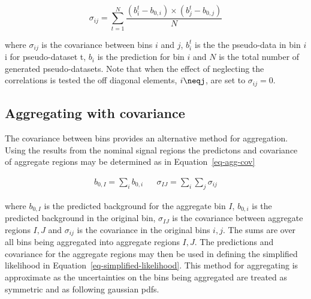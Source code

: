 \begin{equation}
\sigma_{ij}=\sum^N_{t=1}{\frac{(b^t_i-b_{0,i})\times(b^t_j-b_{0,j})}{N}}
\label{eq-cov}
\end{equation}

where $\sigma_{ij}$ is the covariance between bins $i$ and $j$, $b^t_i$ is the
the pseudo-data in bin $i$i for pseudo-dataset t, 
$b_i$ is the prediction for bin $i$ and $N$ is the total number of generated pseudo-datasets.
Note that when the effect of neglecting the correlations is tested the off diagonal 
elements, $i\neqj$, are set to $\sigma_{ij} = 0$.


\subsection{Aggregating with covariance}

The covariance between bins provides an alternative method for aggregation. 
Using the results from the nominal signal regions the predictons and covariance of aggregate regions
may be determined as in Equation~\ref{eq-agg-cov}

\begin{align}
b_{0,I} = \sum_i b_{0,i} && \sigma_{IJ}=\sum_i\sum_j\sigma_{ij}
\label{eq-agg-cov}
\end{align}

where $b_{0,I}$ is the predicted background for the aggregate bin $I$,
$b_{0,i}$ is the predicted background in the original bin, $\sigma_{IJ}$
is the covariance between aggregate regions $I,J$ and $\sigma_{ij}$ is
the covariance in the original bins $i,j$. The sums are over all
bins being aggregated into aggregate regions $I,J$. The predictions
and covariance for the aggregate regions may then be used in defining 
the simplified likelihood in Equation~\ref{eq-simplified-likelihood}.
This method for aggregating is approximate as the uncertainties
on the bins being aggregated are treated as symmetric and as following
gaussian pdfs.




